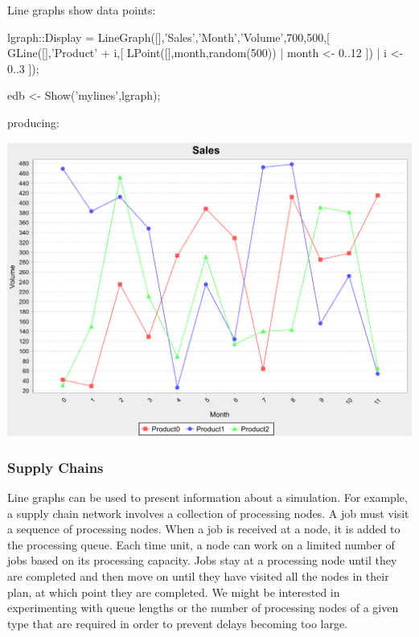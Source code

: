 \documentclass[5p,times]{elsarticle}
\begin{document}
Line graphs show data points:
\begin{ESL}
lgraph::Display = 
  LineGraph([],'Sales','Month','Volume',700,500,[
    GLine([],'Product' + i,[
      LPoint([],month,random(500)) | month <- 0..12 ]) 
    | i <- 0..3 ]);

edb <- Show('mylines',lgraph);
\end{ESL}
producing:
\begin{center}
\includegraphics[width=\columnwidth]{lines}
\end{center}

\subsubsection{Supply Chains}

\label{sec:supply_chains}

Line graphs can be used to present information about a simulation. For example, a supply chain network involves a collection of processing nodes. A job must visit a sequence of processing nodes. When a job is received at a node, it is added to the processing queue. Each time unit, a node can work on a limited number of jobs based on its processing capacity. Jobs stay at a processing node until they are completed and then move on until they have visited all the nodes in their plan, at which point they are completed. We might be interested in experimenting with queue lengths or the number of processing nodes of a given type that are required in order to prevent delays becoming too large.
\end{document}
